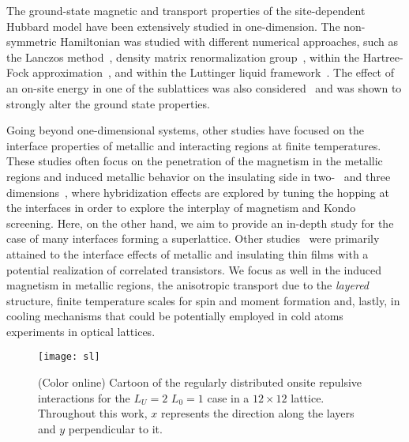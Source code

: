 \documentclass[aps,pra,reprint,twocolumn,showpacs,longbibliography,superscriptaddress]{revtex4-1}
\begin{document}
The ground-state magnetic and transport properties of the site-dependent Hubbard model have been extensively studied in one-dimension. The non-symmetric Hamiltonian was studied with different numerical approaches, such as  the Lanczos method~\cite{TCLP96, TCLP98, TCLP00}, density matrix renormalization group~\cite{Malvezzi02}, within the Hartree-Fock approximation~\cite{Chowdhury07}, and within the Luttinger liquid framework~\cite{Silva_Valencia01}. The effect of an on-site energy in one of the sublattices was also considered~\cite{Gora98, Silva05} and was shown to strongly alter the ground state properties.

Going beyond one-dimensional systems, other studies have focused on the interface properties of metallic and interacting regions at finite temperatures. These studies often focus on the penetration of the magnetism in the metallic regions and induced metallic behavior on the insulating side in two-~\cite{Jiang12} and three dimensions~\cite{Euverte12,Zujev13}, where hybridization effects are explored by tuning the hopping at the interfaces in order to explore the interplay of magnetism and Kondo screening. Here, on the other hand, we aim to provide an in-depth study for the case of many interfaces forming a superlattice. Other studies~\cite{Zhong15} were primarily attained to the interface effects of metallic and insulating thin films with a potential realization of correlated transistors. We focus as well in the induced magnetism in metallic regions, the anisotropic transport due to the \textit{layered} structure, finite temperature scales for spin and moment formation and, lastly, in cooling mechanisms that could be potentially employed in cold atoms experiments in optical lattices.

\begin{figure}[!tb] %
  \texttt{[image: sl]}
 \vspace{-0.1cm}
 \caption{(Color online) Cartoon of the regularly distributed onsite repulsive interactions for the $L_U=2$ $L_0=1$ case in a $12\times12$ lattice. Throughout this work, $x$ represents the direction along the layers and $y$ perpendicular to it.}
 \label{fig:sl}
\end{figure}
\end{document}
